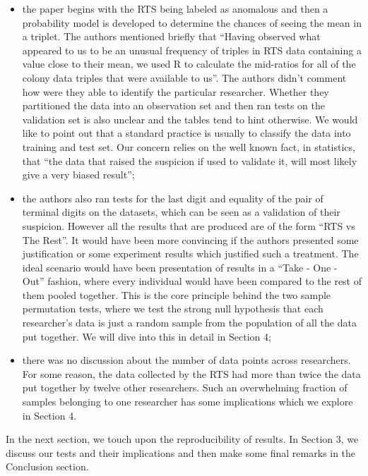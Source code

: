 \documentclass{article}
\begin{document}
\begin{itemize}
\item
  the paper begins with the RTS being labeled as anomalous and then a
  probability model is developed to determine the chances of seeing the
  mean in a triplet. The authors mentioned briefly that ``Having
  observed what appeared to us to be an unusual frequency of triples in
  RTS data containing a value close to their mean, we used R to
  calculate the mid-ratios for all of the colony data triples that were
  available to us''. The authors didn't comment how were they able to
  identify the particular researcher. Whether they partitioned the data
  into an observation set and then ran tests on the validation set is
  also unclear and the tables tend to hint otherwise. We would like to
  point out that a standard practice is usually to classify the data
  into training and test set. Our concern relies on the well known fact,
  in statistics, that ``the data that raised the suspicion if used to
  validate it, will most likely give a very biased result'';
\item
  the authors also ran tests for the last digit and equality of the pair
  of terminal digits on the datasets, which can be seen as a validation
  of their suspicion. However all the results that are produced are of
  the form ``RTS vs The Rest''. It would have been more convincing if
  the authors presented some justification or some experiment results
  which justified such a treatment. The ideal scenario would have been
  presentation of results in a ``Take - One - Out'' fashion, where every
  individual would have been compared to the rest of them pooled
  together. This is the core principle behind the two sample permutation
  tests, where we test the strong null hypothesis that each researcher's
  data is just a random sample from the population of all the data put
  together. We will dive into this in detail in Section 4;
\item
  there was no discussion about the number of data points across
  researchers. For some reason, the data collected by the RTS had more
  than twice the data put together by twelve other researchers. Such an
  overwhelming fraction of samples belonging to one researcher has some
  implications which we explore in Section 4.
\end{itemize}

In the next section, we touch upon the reproducibility of results. In
Section 3, we discuss our tests and their implications and then make
some final remarks in the Conclusion section.
\end{document}

